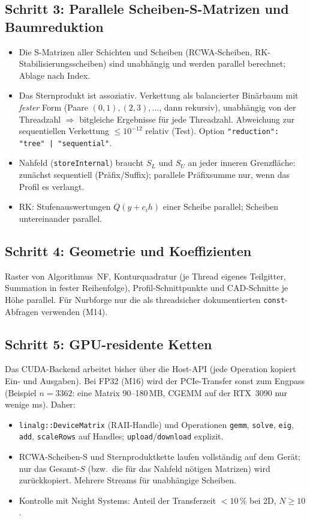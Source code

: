 \subsection{Schritt 3: Parallele Scheiben-S-Matrizen und Baumreduktion}
\begin{itemize}[nosep]
  \item Die S-Matrizen aller Schichten und Scheiben (RCWA-Scheiben, RK-Stabilisierungsscheiben) sind unabhängig und werden
        parallel berechnet; Ablage nach Index.
  \item Das Sternprodukt ist assoziativ. Verkettung als balancierter Binärbaum mit \emph{fester} Form (Paare $(0,1),(2,3),\dots$,
        dann rekursiv), unabhängig von der Threadzahl $\Rightarrow$ bitgleiche Ergebnisse für jede Threadzahl.
        Abweichung zur sequentiellen Verkettung $\le10^{-12}$ relativ (Test). Option \verb!"reduction": "tree" | "sequential"!.
  \item Nahfeld (\verb|storeInternal|) braucht $S_L$ und $S_U$ an jeder inneren Grenzfläche: zunächst sequentiell
        (Präfix/Suffix); parallele Präfixsumme nur, wenn das Profil es verlangt.
  \item RK: Stufenauswertungen $Q(y+c_ih)$ einer Scheibe parallel; Scheiben untereinander parallel.
\end{itemize}

\subsection{Schritt 4: Geometrie und Koeffizienten}
Raster von Algorithmus~NF, Konturquadratur (je Thread eigenes Teilgitter, Summation in fester Reihenfolge),
Profil-Schnittpunkte und CAD-Schnitte je Höhe parallel. Für Nurbforge nur die als threadsicher dokumentierten
\verb|const|-Abfragen verwenden (M14).

\subsection{Schritt 5: GPU-residente Ketten}
Das CUDA-Backend arbeitet bisher über die Host-API (jede Operation kopiert Ein- und Ausgaben). Bei FP32 (M16) wird der
PCIe-Transfer sonst zum Engpass (Beispiel $n=3362$: eine Matrix 90--180\,MB, CGEMM auf der RTX~3090 nur wenige ms).
Daher:
\begin{itemize}[nosep]
  \item \verb|linalg::DeviceMatrix| (RAII-Handle) und Operationen \verb|gemm|, \verb|solve|, \verb|eig|, \verb|add|,
        \verb|scaleRows| auf Handles; \verb|upload|/\verb|download| explizit.
  \item RCWA-Scheiben-S und Sternproduktkette laufen vollständig auf dem Gerät; nur das Gesamt-$S$ (bzw.\ die für das
        Nahfeld nötigen Matrizen) wird zurückkopiert. Mehrere Streams für unabhängige Scheiben.
  \item Kontrolle mit Nsight Systems: Anteil der Transferzeit $<10\,\%$ bei 2D, $N\ge10$.
\end{itemize}


